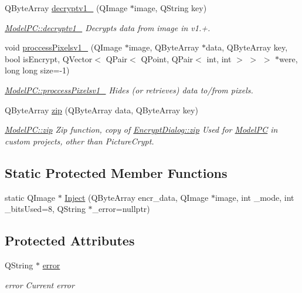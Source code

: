 \begin{DoxyCompactItemize}
Q\+Byte\+Array \hyperlink{class_model_p_c_a7a1f7d491e1bde16936190b9e90896b0}{decryptv1\+\_} (Q\+Image $\ast$image, Q\+String key)
\begin{DoxyCompactList}\small\item\em \hyperlink{class_model_p_c_a7a1f7d491e1bde16936190b9e90896b0}{Model\+P\+C\+::decryptv1\+\_} Decrypts data from image in v1.+. \end{DoxyCompactList}\item 
void \hyperlink{class_model_p_c_a5cdb4d1d61ff62ee9d45b496a7dbf1fb}{proccess\+Pixelsv1\+\_} (Q\+Image $\ast$image, Q\+Byte\+Array $\ast$data, Q\+Byte\+Array key, bool is\+Encrypt, Q\+Vector$<$ Q\+Pair$<$ Q\+Point, Q\+Pair$<$ int, int $>$ $>$ $>$ $\ast$were, long long size=-\/1)
\begin{DoxyCompactList}\small\item\em \hyperlink{class_model_p_c_a5cdb4d1d61ff62ee9d45b496a7dbf1fb}{Model\+P\+C\+::proccess\+Pixelsv1\+\_} Hides (or retrieves) data to/from pixels. \end{DoxyCompactList}\item 
Q\+Byte\+Array \hyperlink{class_model_p_c_afebbbfa4b07deba4f68fc6dfb50f353f}{zip} (Q\+Byte\+Array data, Q\+Byte\+Array key)
\begin{DoxyCompactList}\small\item\em \hyperlink{class_model_p_c_afebbbfa4b07deba4f68fc6dfb50f353f}{Model\+P\+C\+::zip} Zip function, copy of \hyperlink{class_encrypt_dialog_a2bff820a3df4ddc36ecb07ed74b7138a}{Encrypt\+Dialog\+::zip} Used for \hyperlink{class_model_p_c}{Model\+PC} in custom projects, other than Picture\+Crypt. \end{DoxyCompactList}\end{DoxyCompactItemize}
\subsection*{Static Protected Member Functions}
\begin{DoxyCompactItemize}
\item 
static Q\+Image $\ast$ \hyperlink{class_model_p_c_ac17e68e6aab134621b0d151d74acdc82}{Inject} (Q\+Byte\+Array encr\+\_\+data, Q\+Image $\ast$image, int \+\_\+mode, int \+\_\+bits\+Used=8, Q\+String $\ast$\+\_\+error=nullptr)
\end{DoxyCompactItemize}
\subsection*{Protected Attributes}
\begin{DoxyCompactItemize}
\item 
Q\+String $\ast$ \hyperlink{class_model_p_c_a4e5a9c0ca1f06fe5bc478b6bf248c37c}{error}
\begin{DoxyCompactList}\small\item\em error Current error \end{DoxyCompactList}\end{DoxyCompactItemize}


